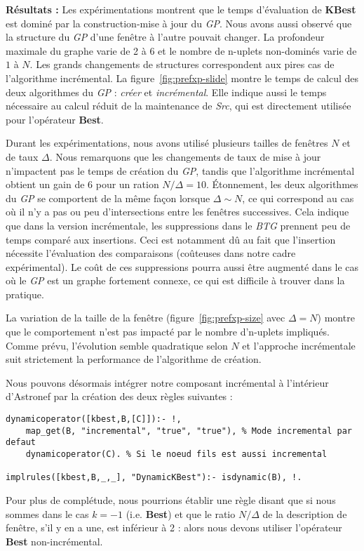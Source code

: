 \textbf{Résultats :} Les expérimentations montrent que le temps d'évaluation de \textbf{KBest} est dominé par la construction-mise à jour du \textit{GP}. Nous avons aussi observé que la structure du \textit{GP} d'une fenêtre à l'autre pouvait changer. La profondeur maximale du graphe varie de 2 à 6 et le nombre de n-uplets non-dominés varie de $1$ à $N$. Les grands changements de structures correspondent aux pires cas de l'algorithme incrémental. La figure~\ref{fig:prefxp-slide} montre le temps de calcul des deux algorithmes du \textit{GP} : \textit{créer} et \textit{incrémental}. Elle indique aussi le temps nécessaire au calcul réduit de la maintenance de \textit{Src}, qui est directement utilisée pour l'opérateur \textbf{Best}. 

Durant les expérimentations, nous avons utilisé plusieurs tailles de fenêtres $N$ et de taux $\Delta$. Nous remarquons que les changements de taux de mise à jour n'impactent pas le temps de création du \textit{GP}, tandis que l'algorithme incrémental obtient un gain de 6 pour un ration $N/\Delta=10$. Étonnement, les deux algorithmes du \textit{GP} se comportent de la même façon lorsque $\Delta\sim N$, ce qui correspond au cas où il n'y a pas ou peu d'intersections entre les fenêtres successives. Cela indique que dans la version incrémentale, les suppressions dans le \textit{BTG} prennent peu de temps comparé aux insertions. Ceci est notamment dû au fait que l'insertion nécessite l'évaluation des comparaisons (coûteuses dans notre cadre expérimental). Le coût de ces suppressions pourra aussi être augmenté dans le cas où le \textit{GP} est un graphe fortement connexe, ce qui est difficile à trouver dans la pratique.

La variation de la taille de la fenêtre (figure~\ref{fig:prefxp-size} avec $\Delta=N$) montre que le comportement n'est pas impacté par le nombre d'n-uplets impliqués. Comme prévu, l'évolution semble quadratique selon $N$ et l'approche incrémentale suit strictement la performance de l'algorithme de création.

Nous pouvons désormais intégrer notre composant incrémental à l'intérieur d'Astronef par la création des deux règles suivantes :
\begin{lstlisting}[language=PrologAstral]
dynamicoperator([kbest,B,[C]]):- !,
    map_get(B, "incremental", "true", "true"), % Mode incremental par defaut
    dynamicoperator(C). % Si le noeud fils est aussi incremental

implrules([kbest,B,_,_], "DynamicKBest"):- isdynamic(B), !.
\end{lstlisting}
Pour plus de complétude, nous pourrions établir une règle disant que si nous sommes dans le cas $k=-1$ (i.e. \textbf{Best}) et que le ratio $N/\Delta$ de la description de fenêtre, s'il y en a une, est inférieur à 2 : alors nous devons utiliser l'opérateur \textbf{Best} non-incrémental.
